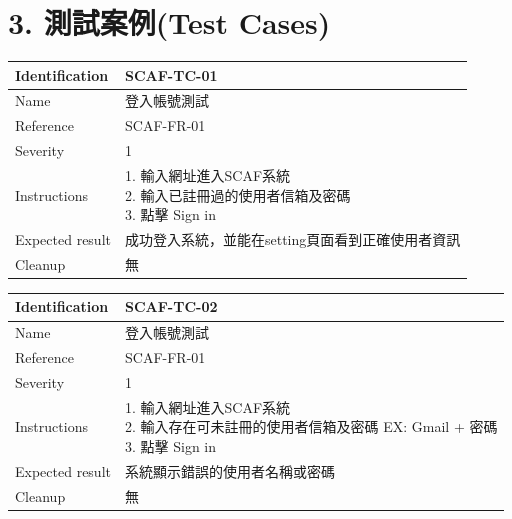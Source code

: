 \documentclass{report}
\begin{document}
\section*{3. 測試案例(Test Cases)}
\begin{tabularx}{\textwidth}{
  |p{}%
  |p{}|%
  }
  \hline
  \centering Identification &  SCAF-TC-01 \\
  \hline
  \centering Name & 登入帳號測試 \\
  \hline
  \centering Reference & SCAF-FR-01 \\
  \hline
  \centering Severity & 1 \\
  \hline
  \centering Instructions & 
  \makecell[l]{
    1. 輸入網址進入SCAF系統 \\
    2. 輸入已註冊過的使用者信箱及密碼 \\
    3. 點擊 Sign in
  }\\
  \hline
  \centering Expected result & 成功登入系統，並能在setting頁面看到正確使用者資訊 \\
  \hline
  \centering Cleanup & 無 \\
  \hline
\end{tabularx}
\newline\newline
\begin{tabularx}{\textwidth}{
  |p{}%
  |p{}|%
  }
  \hline
  \centering Identification &  SCAF-TC-02 \\
  \hline
  \centering Name & 登入帳號測試 \\
  \hline
  \centering Reference & SCAF-FR-01 \\
  \hline
  \centering Severity & 1 \\
  \hline
  \centering Instructions & 
  \makecell[l]{
    1. 輸入網址進入SCAF系統 \\
    2. 輸入存在可未註冊的使用者信箱及密碼 EX: Gmail + 密碼 \\
    3. 點擊 Sign in
  }\\
  \hline
  \centering Expected result & 系統顯示錯誤的使用者名稱或密碼 \\
  \hline
  \centering Cleanup & 無 \\
  \hline
\end{tabularx}
\\
\newline
\\
\end{document}
